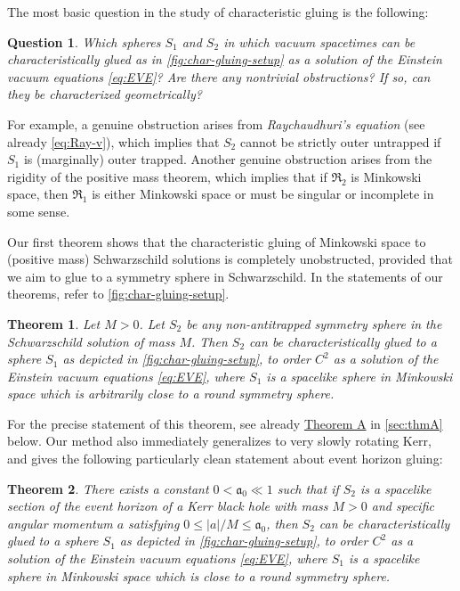 \documentclass[10pt]{article}
\numberwithin{equation}{section}
\theoremstyle{plain}
\newtheorem{thm}{Theorem}%
\newtheorem{question}{Question}
\theoremstyle{definition}
\begin{document}
The most basic question in the study of characteristic gluing is the following:
\begin{question}\label{question-1}
    Which spheres $S_1$ and $S_2$ in which vacuum spacetimes can be characteristically glued as in \cref{fig:char-gluing-setup} as a solution of the Einstein vacuum equations \eqref{eq:EVE}? Are there any nontrivial obstructions? If so, can they be characterized geometrically? 
\end{question}

For example, a genuine obstruction arises from \emph{Raychaudhuri's equation} (see already \eqref{eq:Ray-v}), which implies that $S_2$ cannot be strictly outer untrapped if $S_1$ is (marginally) outer trapped. Another genuine obstruction arises from the rigidity of the positive mass theorem, which implies that if $\mathfrak R_2$ is Minkowski space, then $\mathfrak R_1$ is either Minkowski space or must be singular or incomplete in some sense. 

Our first theorem shows that the characteristic gluing of Minkowski space to (positive mass) Schwarzschild solutions is completely unobstructed, provided that we aim to glue to a symmetry sphere in Schwarzschild. In the statements of our theorems, refer to \cref{fig:char-gluing-setup}.

\begin{thm}\label{thm:Schwarzschild-gluing}
    Let $M>0$. Let $S_2$ be any non-antitrapped symmetry sphere in the Schwarzschild solution of mass $M$. Then $S_2$ can be characteristically glued to a sphere $S_1$ as depicted in \cref{fig:char-gluing-setup}, to order $C^2$ as a solution of the Einstein vacuum equations \eqref{eq:EVE}, where $S_1$ is a spacelike sphere in Minkowski space which is arbitrarily close to a round symmetry sphere. 
\end{thm}

For the precise statement of this theorem, see already \hyperlink{thmA}{Theorem A} in \cref{sec:thmA} below. Our method also immediately generalizes to very slowly rotating Kerr, and gives the following particularly clean statement about event horizon gluing:

\begin{thm}\label{thm:Kerr-gluing} There exists a constant $0<\mathfrak a_0\ll 1$  such that if $S_2$ is  a spacelike section of the event horizon of a Kerr black hole with mass $M>0$ and specific angular momentum $a$ satisfying $0\le|a|/M\le \mathfrak a_0$, then $S_2$ can be characteristically glued to a sphere $S_1$ as depicted in \cref{fig:char-gluing-setup}, to order $C^2$ as a solution of the Einstein vacuum equations \eqref{eq:EVE}, where $S_1$ is a spacelike sphere in Minkowski space which is close to a round symmetry sphere.
\end{thm}
\end{document}
